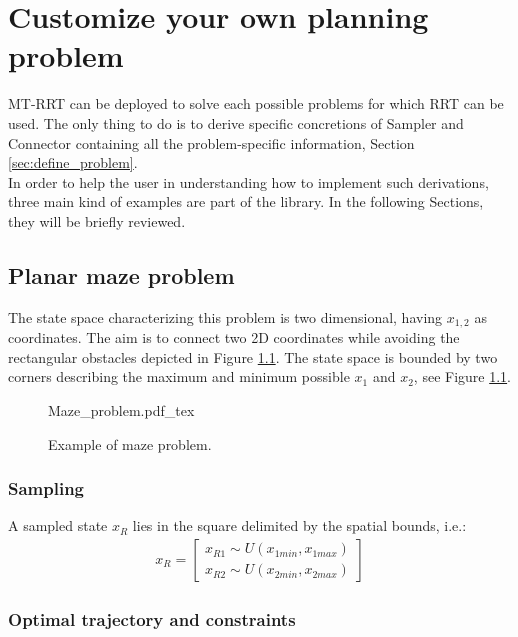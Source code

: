 \chapter{Customize your own planning problem}
\label{chap:custom}

MT-RRT can be deployed to solve each possible problems for which RRT can be used. The only thing to do is to derive specific concretions of Sampler and Connector containing all the problem-specific information, Section \ref{sec:define_problem}.
\\
In order to help the user in understanding how to implement such derivations, three main kind of examples are part of the library. In the following Sections, they will be briefly reviewed.

\section{Planar maze problem}

The state space characterizing this problem is two dimensional, having $x_{1,2}$ as coordinates. The aim is to connect two 2D coordinates while avoiding the rectangular obstacles depicted in Figure \ref{fig:Maze_problem}.
The state space is bounded by two corners describing the maximum and minimum possible $x_1$ and $x_2$, see Figure \ref{fig:Maze_problem}.

 \begin{figure}
	 \centering
 \def\svgwidth{0.85 \columnwidth}
 {Maze_problem.pdf_tex} 
	 \caption{Example of maze problem.}
 \label{fig:Maze_problem}
 \end{figure}

\subsection{Sampling}

A sampled state $x_R$ lies in the square delimited by the spatial bounds, i.e.:
\begin{eqnarray}
x_R = \begin{bmatrix} x_{R1} \sim U(x_{1min}, x_{1max}) \\ x_{R2} \sim U(x_{2min}, x_{2max})  \end{bmatrix}
\end{eqnarray}

\subsection{Optimal trajectory and constraints}
\label{sec:traj_maze}

